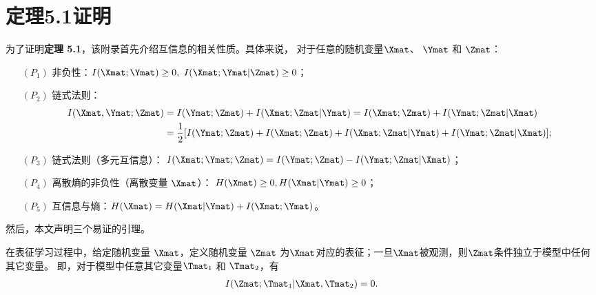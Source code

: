 \chapter{定理5.1证明}


为了证明\textbf{定理 5.1}，该附录首先介绍互信息的相关性质。具体来说，
对于任意的随机变量$\Xmat$、 $\Ymat$ 和 $\Zmat$：
\begin{enumerate}[itemindent=1.2em]
\item[$(P_1)$] 非负性：$I(\Xmat; \Ymat) \ge 0, ~I(\Xmat; \Ymat|\Zmat)\ge 0$；
\item[$(P_2)$] 链式法则：
\begin{align*}
I(\Xmat, \Ymat; \Zmat) &= I(\Ymat; \Zmat) + I(\Xmat; \Zmat|\Ymat) = I(\Xmat; \Zmat) + I(\Ymat; \Zmat|\Xmat)\\
&= \frac{1}{2} [I(\Ymat; \Zmat) + I(\Xmat; \Zmat) + I(\Xmat; \Zmat|\Ymat) + I(\Ymat; \Zmat|\Xmat)];
\end{align*}
\item[$(P_3)$] 链式法则（多元互信息）： $I(\Xmat; \Ymat; \Zmat) = I(\Ymat; \Zmat) - I(\Ymat; \Zmat|\Xmat)$；
\item[$(P_4)$] 离散熵的非负性（离散变量 $\Xmat$）： $H(\Xmat)\ge 0, H(\Xmat|\Ymat)\ge 0$；
\item[$(P_5)$] 互信息与熵：$H(\Xmat)= H(\Xmat|\Ymat)+ I(\Xmat; \Ymat)$。
\end{enumerate}

然后，本文声明三个易证的引理。

\begin{lemma}
\label{lem:mi_xz_condition}
在表征学习过程中，给定随机变量 $\Xmat$，定义随机变量 $\Zmat$ 为$\Xmat$对应的表征；一旦$\Xmat$被观测，则$\Zmat$条件独立于模型中任何其它变量。
即，对于模型中任意其它变量$\Tmat_1$ 和 $\Tmat_2$，有
\begin{align}
I(\Zmat; \Tmat_1|\Xmat, \Tmat_2) = 0. 
\end{align}
\end{lemma} 


